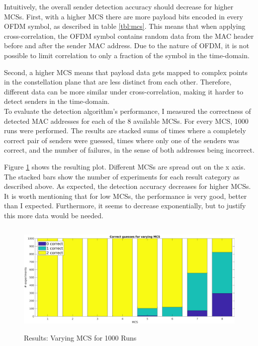 Intuitively, the overall sender detection accuracy should decrease for higher \glspl{MCS}. First, with a higher \gls{MCS} there are more payload bits encoded in every \gls{OFDM} symbol, as described in table \ref{tbl:mcs}. This means that when applying cross-correlation, the \gls{OFDM} symbol contains random data from the \gls{MAC} header before and after the sender \gls{MAC} address. Due to the nature of \gls{OFDM}, it is not possible to limit correlation to only a fraction of the symbol in the time-domain.

Second, a higher \gls{MCS} means that payload data gets mapped to complex points in the constellation plane that are less distinct from each other. Therefore, different data can be more similar under cross-correlation, making it harder to detect senders in the time-domain.\\

To evaluate the detection algorithm's performance, I measured the correctness of detected \gls{MAC} addresses for each of the 8 available \glspl{MCS}. For every \gls{MCS}, 1000 runs were performed. The results are stacked sums of times where a completely correct pair of senders were guessed, times where only one of the senders was correct, and the number of failures, in the sense of both addresses being incorrect.

Figure \ref{fig:vary_mcs} shows the resulting plot. Different \glspl{MCS} are spread out on the x axis. The stacked bars show the number of experiments for each result category as described above. As expected, the detection accuracy decreases for higher \glspl{MCS}. It is worth mentioning that for low \glspl{MCS}, the performance is very good, better than I expected. Furthermore, it seems to decrease exponentially, but to justify this more data would be needed.

\begin{figure}[H]
	\centering
	\includegraphics[height=5.5cm]{gfx/plots/mcs}
	\caption{Results: Varying MCS for 1000 Runs}
	\label{fig:vary_mcs}
\end{figure}


